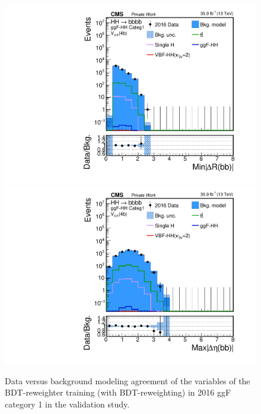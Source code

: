 \begin{figure}[htbp!]
\begin{center}
\includegraphics[width=0.24\linewidth]{Figures/Modeling/background/plotsDatadrivenWithBDT/2016/GGFcateg1_CR_210/Histogram/plot2016_min_4b_deltaR_Btag4_GGFcateg1_CR_210_Histogram_log.pdf}
\includegraphics[width=0.24\linewidth]{Figures/Modeling/background/plotsDatadrivenWithBDT/2016/GGFcateg1_CR_210/Histogram/plot2016_max_4b_deltaEta_Btag4_GGFcateg1_CR_210_Histogram_log.pdf}
\end{center}
\caption{Data versus background modeling agreement of the variables of the BDT-reweighter training (with  BDT-reweighting) in 2016 ggF category 1 in the validation study.}
\label{bkg:fig:valbdtregvarggf1_2016}
\end{figure}

